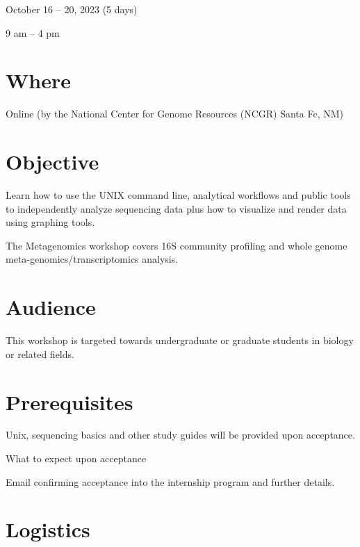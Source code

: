 \documentclass[
]{book}
\begin{document}
October 16 -- 20, 2023 (5 days)

9 am -- 4 pm

\hypertarget{where-2}{%
\section*{Where}\label{where-2}}

Online (by the National Center for Genome Resources (NCGR) Santa Fe, NM)

\hypertarget{objective-2}{%
\section*{Objective}\label{objective-2}}

Learn how to use the UNIX command line, analytical workflows and public tools to independently analyze sequencing data plus how to visualize and render data using graphing tools.

The Metagenomics workshop covers 16S community profiling and whole genome meta-genomics/transcriptomics analysis.

\hypertarget{audience-2}{%
\section*{Audience}\label{audience-2}}

This workshop is targeted towards undergraduate or graduate students in biology or related fields.

\hypertarget{prerequisites-2}{%
\section*{Prerequisites}\label{prerequisites-2}}

Unix, sequencing basics and other study guides will be provided upon acceptance.

What to expect upon acceptance

Email confirming acceptance into the internship program and further details.

\hypertarget{logistics-2}{%
\section*{Logistics}\label{logistics-2}}
\end{document}
